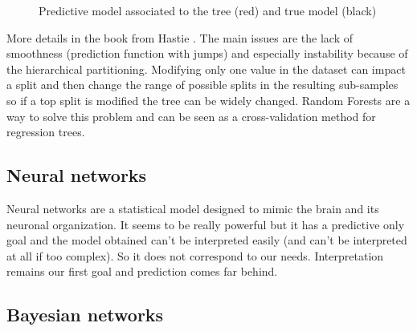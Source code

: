 \documentclass[12pt,a4paper]{report}
\begin{document}
\begin{figure}[h!]
	 \quad
	\caption{Predictive model associated to the tree (red) and true model (black)}\label{arbretrivial}
\end{figure}

More details in the book from Hastie \cite{hastie2009elements}. The main issues are the lack of smoothness (prediction function with jumps) and especially instability because of the hierarchical partitioning. Modifying only one value in the dataset can impact a split and then change the range of possible splits in the resulting sub-samples so if a top split is modified the tree can be widely changed. Random Forests are a way to solve this problem and can be seen as a cross-validation method for regression trees.
	
	\subsection{Neural networks}	
		Neural networks \cite{fausett1994fundamentals} are a statistical model designed to mimic the brain and its neuronal organization. It seems to be really powerful but it has a predictive only goal and the model obtained can't be interpreted easily (and can't be interpreted at all if too complex). So it does not correspond to our needs. Interpretation remains our first goal and prediction comes far behind.
		
	\subsection{Bayesian networks}
		
\end{document}
